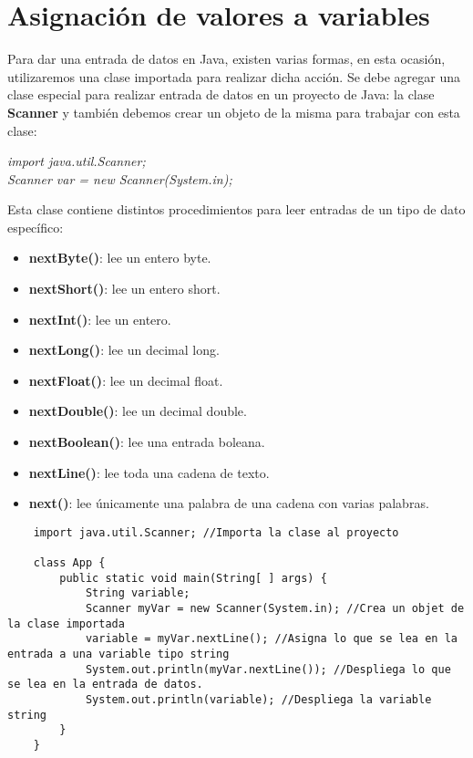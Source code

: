 \section{Asignación de valores a variables}
Para dar una entrada de datos en Java, existen varias formas, en esta ocasión, utilizaremos una clase importada para realizar dicha acción. Se debe agregar una clase especial para realizar entrada de datos en un proyecto de Java: la clase \textbf{Scanner} y también debemos crear un objeto de la misma para trabajar con esta clase:\begin{center}\textit{import java.util.Scanner;\\Scanner var = new Scanner(System.in);}\end{center}
Esta clase contiene distintos procedimientos para leer entradas de un tipo de dato específico:
\begin{itemize}
    \item \textbf{nextByte()}: lee un entero byte.
    \item \textbf{nextShort()}: lee un entero short.
    \item \textbf{nextInt()}: lee un entero.
    \item \textbf{nextLong()}: lee un decimal long.
    \item \textbf{nextFloat()}: lee un decimal float.
    \item \textbf{nextDouble()}: lee un decimal double.
    \item \textbf{nextBoolean()}: lee una entrada boleana.
    \item \textbf{nextLine()}: lee toda una cadena de texto.
    \item \textbf{next()}: lee únicamente una palabra de una cadena con varias palabras.
\end{itemize}
\begin{lstlisting}
    import java.util.Scanner; //Importa la clase al proyecto

    class App {
        public static void main(String[ ] args) {
            String variable;
            Scanner myVar = new Scanner(System.in); //Crea un objet de la clase importada
            variable = myVar.nextLine(); //Asigna lo que se lea en la entrada a una variable tipo string
            System.out.println(myVar.nextLine()); //Despliega lo que se lea en la entrada de datos.
            System.out.println(variable); //Despliega la variable string
        }
    }
\end{lstlisting}